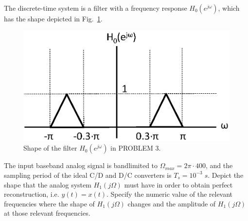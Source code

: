 \documentclass[a4paper,11pt,oneside]{article}
\begin{document}
The discrete-time system is a filter with a frequency response $H_{0}(e^{j\omega})$, which has the shape depicted in Fig.~\ref{fig:filtershape}.

\begin{figure}[h!]
\centering
\includegraphics[width=.5\textwidth]{fig5.eps}
\caption{Shape of the filter $H_{0}(e^{j\omega})$ in PROBLEM 3.}
\label{fig:filtershape}
\end{figure} 

The input baseband analog signal is bandlimited to $\Omega_{max}=2\pi\cdot 400$, and the sampling period of the ideal C/D and D/C converters is $T_s=10^{-3}\; s$. Depict the shape that the analog system $H_{1}(j\Omega)$ must have in order to obtain perfect reconstruction, i.e. $y(t)=x(t)$. Specify the numeric value of the relevant frequencies where the shape of $H_{1}(j\Omega)$ changes and the amplitude of $H_{1}(j\Omega)$ at those relevant frequencies. 


\vspace{1cm}
\end{document}
